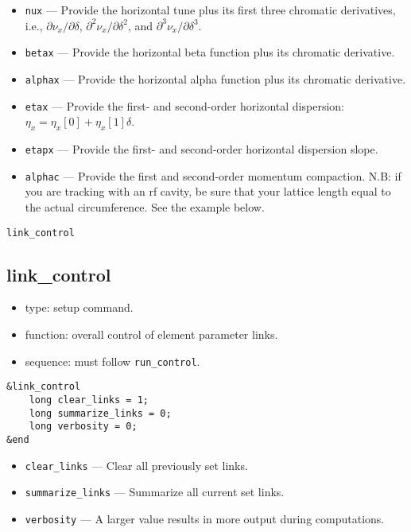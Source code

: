 \documentclass[11pt]{article}
\begin{document}
\begin{itemize}
\item \verb|nux| --- Provide the horizontal tune plus its first three chromatic derivatives, i.e.,
  $\partial \nu_x/\partial\delta$, $\partial^2 \nu_x/\partial\delta^2$, and
  $\partial^3 \nu_x/\partial\delta^3$.
\item \verb|betax| --- Provide the horizontal beta function plus its chromatic derivative.
\item \verb|alphax| --- Provide the horizontal alpha function plus its chromatic derivative.
\item \verb|etax| --- Provide the first- and second-order horizontal dispersion:
  $\eta_x = \eta_x\left[0\right] + \eta_x\left[1\right]\delta$.
\item \verb|etapx| --- Provide the first- and second-order horizontal dispersion slope.
\item \verb|alphac| --- Provide the first and second-order momentum compaction.  N.B: if you are tracking
 with an rf cavity, be sure that your lattice length equal to the actual circumference.  See the example below.
\end{itemize}

\newpage
\begin{center}{\Large\verb|link_control|}\end{center}
\subsection{link\_control \label{subsec:linkcontrol}}

\begin{itemize}
\item type: setup command.
\item function: overall control of element parameter links.
\item sequence: must follow \verb|run_control|.
\end{itemize}

\begin{verbatim}
&link_control
    long clear_links = 1;
    long summarize_links = 0;
    long verbosity = 0;
&end
\end{verbatim}

\begin{itemize}
\item \verb|clear_links| --- Clear all previously set links.
\item \verb|summarize_links| --- Summarize all current set links.
\item \verb|verbosity| --- A larger value results in more output
during computations.

\end{itemize}
\end{document}
